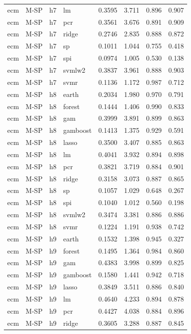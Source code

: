 \begin{ThreePartTable}
\begin{longtable}[t]{llclcccc}
ecm & M-SP & h7 & lm & 0.3595 & 3.711 & 0.896 & 0.907\\
ecm & M-SP & h7 & pcr & 0.3561 & 3.676 & 0.891 & 0.909\\
ecm & M-SP & h7 & ridge & 0.2746 & 2.835 & 0.888 & 0.872\\
ecm & M-SP & h7 & sp & 0.1011 & 1.044 & 0.755 & 0.418\\
ecm & M-SP & h7 & spi & 0.0974 & 1.005 & 0.530 & 0.138\\
ecm & M-SP & h7 & svmlw2 & 0.3837 & 3.961 & 0.888 & 0.903\\
ecm & M-SP & h7 & svmr & 0.1136 & 1.172 & 0.987 & 0.712\\
\addlinespace
ecm & M-SP & h8 & earth & 0.2034 & 1.980 & 0.970 & 0.791\\
ecm & M-SP & h8 & forest & 0.1444 & 1.406 & 0.990 & 0.833\\
ecm & M-SP & h8 & gam & 0.3999 & 3.891 & 0.899 & 0.863\\
ecm & M-SP & h8 & gamboost & 0.1413 & 1.375 & 0.929 & 0.591\\
ecm & M-SP & h8 & lasso & 0.3500 & 3.407 & 0.885 & 0.863\\
ecm & M-SP & h8 & lm & 0.4041 & 3.932 & 0.894 & 0.898\\
ecm & M-SP & h8 & pcr & 0.3821 & 3.719 & 0.884 & 0.901\\
ecm & M-SP & h8 & ridge & 0.3158 & 3.073 & 0.887 & 0.865\\
ecm & M-SP & h8 & sp & 0.1057 & 1.029 & 0.648 & 0.267\\
ecm & M-SP & h8 & spi & 0.1040 & 1.012 & 0.560 & 0.198\\
ecm & M-SP & h8 & svmlw2 & 0.3474 & 3.381 & 0.886 & 0.886\\
ecm & M-SP & h8 & svmr & 0.1224 & 1.191 & 0.938 & 0.742\\
\addlinespace
ecm & M-SP & h9 & earth & 0.1532 & 1.398 & 0.945 & 0.327\\
ecm & M-SP & h9 & forest & 0.1495 & 1.364 & 0.984 & 0.860\\
ecm & M-SP & h9 & gam & 0.4383 & 3.998 & 0.899 & 0.825\\
ecm & M-SP & h9 & gamboost & 0.1580 & 1.441 & 0.942 & 0.718\\
ecm & M-SP & h9 & lasso & 0.3849 & 3.511 & 0.886 & 0.840\\
ecm & M-SP & h9 & lm & 0.4640 & 4.233 & 0.894 & 0.878\\
ecm & M-SP & h9 & pcr & 0.4427 & 4.038 & 0.884 & 0.896\\
ecm & M-SP & h9 & ridge & 0.3605 & 3.288 & 0.887 & 0.845\\

\end{longtable}
\end{ThreePartTable}
